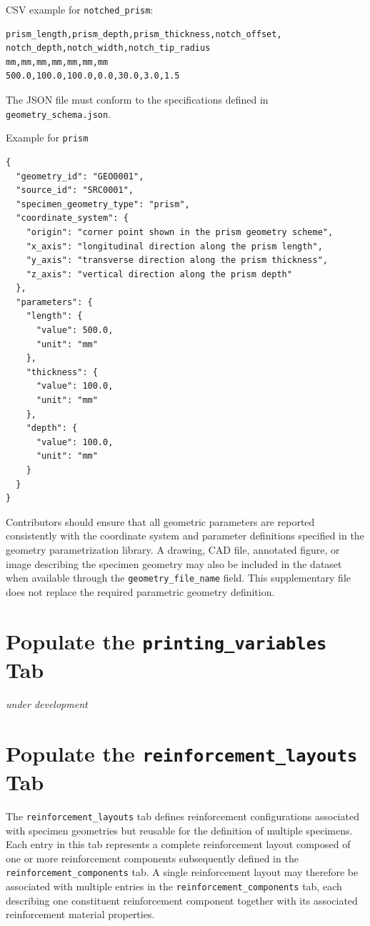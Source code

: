 \documentclass[11pt]{book}
\begin{document}
\vspace{5mm}
CSV example for \texttt{notched\_prism}:


\begin{verbatim}
prism_length,prism_depth,prism_thickness,notch_offset,
notch_depth,notch_width,notch_tip_radius
mm,mm,mm,mm,mm,mm,mm
500.0,100.0,100.0,0.0,30.0,3.0,1.5
\end{verbatim}

The JSON file must conform to the specifications defined in \texttt{geometry\_schema.json}.

\vspace{5mm}
Example for \texttt{prism}

\begin{verbatim}
{
  "geometry_id": "GEO0001",
  "source_id": "SRC0001",
  "specimen_geometry_type": "prism",
  "coordinate_system": {
    "origin": "corner point shown in the prism geometry scheme",
    "x_axis": "longitudinal direction along the prism length",
    "y_axis": "transverse direction along the prism thickness",
    "z_axis": "vertical direction along the prism depth"
  },
  "parameters": {
    "length": {
      "value": 500.0,
      "unit": "mm"
    },
    "thickness": {
      "value": 100.0,
      "unit": "mm"
    },
    "depth": {
      "value": 100.0,
      "unit": "mm"
    }
  }
}
\end{verbatim}


Contributors should ensure that all geometric parameters are reported consistently with the coordinate system and parameter definitions specified in the geometry parametrization library. A drawing, CAD file, annotated figure, or image describing the specimen geometry may also be included in the dataset when available through the \texttt{geometry\_file\_name} field. This supplementary file does not replace the required parametric geometry definition.

\section{Populate the \texttt{printing\_variables} Tab}
{\emph{under development}}




\section{Populate the \texttt{reinforcement\_layouts} Tab}

The \texttt{reinforcement\_layouts} tab defines reinforcement configurations associated with specimen geometries but reusable for the definition of multiple specimens. Each entry in this tab represents a complete reinforcement layout composed of one or more reinforcement components subsequently defined in the \texttt{reinforcement\_components} tab. A single reinforcement layout may therefore be associated with multiple entries in the \texttt{reinforcement\_components} tab, each describing one constituent reinforcement component together with its associated reinforcement material properties.
\end{document}

